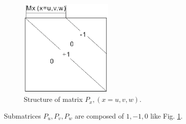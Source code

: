 \begin{figure}[!ht]
\centering
\includegraphics[width=0.4\textwidth]{bilder/P_matrix}
\caption{Structure of matrix $P_{x},(x=u,v,w)$.}
\label{fig:Matrix Px}
\end{figure}
Submatrices $P_{u},P_{v},P_{w}$ are composed of $1,-1,0$ like Fig. \ref{fig:Matrix Px}.\\
 
